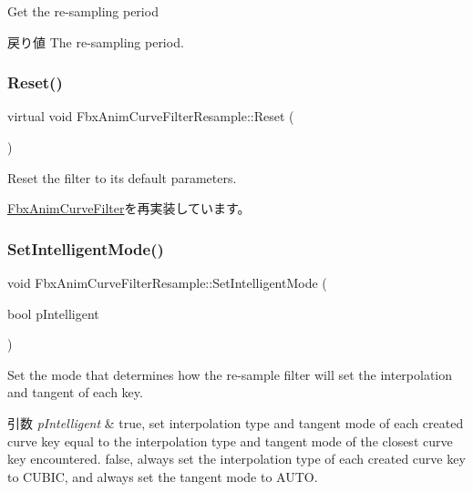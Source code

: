 Get the re-\/sampling period \begin{DoxyReturn}{戻り値}
The re-\/sampling period. 
\end{DoxyReturn}
\mbox{\label{class_fbx_anim_curve_filter_resample_a149622ab0dd1ffd26ca1e59f31aaed93}} 
\subsubsection{\texorpdfstring{Reset()}{Reset()}}
{\footnotesize\ttfamily virtual void Fbx\+Anim\+Curve\+Filter\+Resample\+::\+Reset (\begin{DoxyParamCaption}{ }\end{DoxyParamCaption})\hspace{0.3cm}{\ttfamily [virtual]}}

Reset the filter to its default parameters. 

\hyperlink{class_fbx_anim_curve_filter_a57fb35baaaa85adb08946383cf40e811}{Fbx\+Anim\+Curve\+Filter}を再実装しています。

\mbox{\label{class_fbx_anim_curve_filter_resample_a8ac3cafa7fe863a9d3205452f6f15c49}} 
\subsubsection{\texorpdfstring{Set\+Intelligent\+Mode()}{SetIntelligentMode()}}
{\footnotesize\ttfamily void Fbx\+Anim\+Curve\+Filter\+Resample\+::\+Set\+Intelligent\+Mode (\begin{DoxyParamCaption}\item[{bool}]{p\+Intelligent }\end{DoxyParamCaption})}

Set the mode that determines how the re-\/sample filter will set the interpolation and tangent of each key. 
\begin{DoxyParams}{引数}
{\em p\+Intelligent} & {\ttfamily true}, set interpolation type and tangent mode of each created curve key equal to the interpolation type and tangent mode of the closest curve key encountered. {\ttfamily false}, always set the interpolation type of each created curve key to C\+U\+B\+IC, and always set the tangent mode to A\+U\+TO. \\
\hline
\end{DoxyParams}
\mbox{\label{class_fbx_anim_curve_filter_resample_abb2e4701aa3e44d945cfa92254aabbb0}} 
